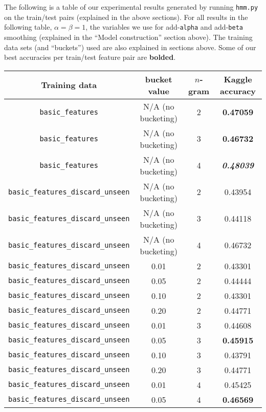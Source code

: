 \documentclass{article}
\begin{document}
\newpage
The following is a table of our experimental results generated by running \texttt{hmm.py} on the train/test pairs (explained in the above sections). For all results in the following table, $\alpha = \beta = 1$, the variables we use for add-\texttt{alpha} and add-\texttt{beta} smoothing (explained in the ``Model construction'' section above). The training data sets (and ``buckets'') used are also explained in sections above. Some of our best accuracies per train/test feature pair are \textbf{bolded}.\par\bigskip

{\small
\begin{tabular}{|c|c|c|c|}\hline
Training data & bucket value & $n$-gram & Kaggle accuracy\\\hline
\texttt{basic\_features} & N/A (no bucketing) & 2 & \textbf{0.47059}\\\hline
\texttt{basic\_features} & N/A (no bucketing) & 3 & \textbf{0.46732}\\\hline
\texttt{basic\_features} & N/A (no bucketing) & 4 & \textbf{\textit{0.48039}}\\\hline\hline
\texttt{basic\_features\_discard\_unseen} & N/A (no bucketing) & 2 & 0.43954\\\hline
\texttt{basic\_features\_discard\_unseen} & N/A (no bucketing) & 3 & 0.44118\\\hline
\texttt{basic\_features\_discard\_unseen} & N/A (no bucketing) & 4 & 0.46732\\\hline
\texttt{basic\_features\_discard\_unseen} & 0.01 & 2 & 0.43301\\
\texttt{basic\_features\_discard\_unseen} & 0.05 & 2 & 0.44444\\
\texttt{basic\_features\_discard\_unseen} & 0.10 & 2 & 0.43301\\
\texttt{basic\_features\_discard\_unseen} & 0.20 & 2 & 0.44771\\\hline
\texttt{basic\_features\_discard\_unseen} & 0.01 & 3 & 0.44608\\
\texttt{basic\_features\_discard\_unseen} & 0.05 & 3 & \textbf{0.45915}\\
\texttt{basic\_features\_discard\_unseen} & 0.10 & 3 & 0.43791\\
\texttt{basic\_features\_discard\_unseen} & 0.20 & 3 & 0.44771\\\hline
\texttt{basic\_features\_discard\_unseen} & 0.01 & 4 & 0.45425\\
\texttt{basic\_features\_discard\_unseen} & 0.05 & 4 & \textbf{0.46569}\\

\end{tabular}}
\end{document}

